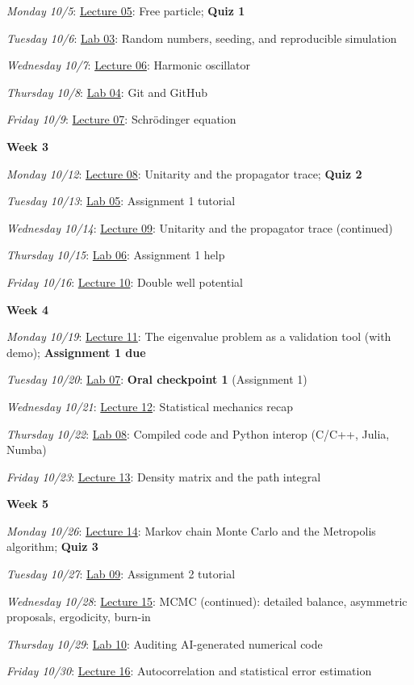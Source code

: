 \documentclass[12pt]{article}
\begin{document}
\emph{Monday 10/5}: \underline{Lecture 05}: Free particle; \textbf{Quiz 1}

\emph{Tuesday 10/6}: \underline{Lab 03}: Random numbers, seeding, and reproducible simulation

\emph{Wednesday 10/7}: \underline{Lecture 06}: Harmonic oscillator

\emph{Thursday 10/8}: \underline{Lab 04}: Git and GitHub

\emph{Friday 10/9}: \underline{Lecture 07}: Schr\"{o}dinger equation

\noindent\textbf{Week 3}

\emph{Monday 10/12}: \underline{Lecture 08}: Unitarity and the propagator trace; \textbf{Quiz 2}

\emph{Tuesday 10/13}: \underline{Lab 05}: Assignment 1 tutorial

\emph{Wednesday 10/14}: \underline{Lecture 09}: Unitarity and the propagator trace (continued)

\emph{Thursday 10/15}: \underline{Lab 06}: Assignment 1 help

\emph{Friday 10/16}: \underline{Lecture 10}: Double well potential

\noindent\textbf{Week 4}

\emph{Monday 10/19}: \underline{Lecture 11}: The eigenvalue problem as a validation tool (with demo); \textbf{Assignment 1 due}

\emph{Tuesday 10/20}: \underline{Lab 07}: \textbf{Oral checkpoint 1} (Assignment 1)

\emph{Wednesday 10/21}: \underline{Lecture 12}: Statistical mechanics recap

\emph{Thursday 10/22}: \underline{Lab 08}: Compiled code and Python interop (C/C++, Julia, Numba)

\emph{Friday 10/23}: \underline{Lecture 13}: Density matrix and the path integral

\noindent\textbf{Week 5}

\emph{Monday 10/26}: \underline{Lecture 14}: Markov chain Monte Carlo and the Metropolis algorithm; \textbf{Quiz 3}

\emph{Tuesday 10/27}: \underline{Lab 09}: Assignment 2 tutorial

\emph{Wednesday 10/28}: \underline{Lecture 15}: MCMC (continued): detailed balance, asymmetric proposals, ergodicity, burn-in

\emph{Thursday 10/29}: \underline{Lab 10}: Auditing AI-generated numerical code

\emph{Friday 10/30}: \underline{Lecture 16}: Autocorrelation and statistical error estimation
\end{document}
